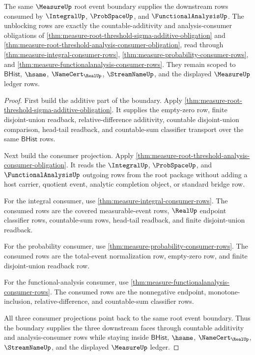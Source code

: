\begin{theorem}
\label{thm:measure-root-event-boundary-unblock}
The same $\MeasureUp$ root event boundary supplies the downstream rows
consumed by $\IntegralUp$, $\ProbSpaceUp$, and $\FunctionalAnalysisUp$. The
unblocking rows are exactly the countable-additivity and analysis-consumer
obligations of
\autoref{thm:measure-root-threshold-sigma-additive-obligation} and
\autoref{thm:measure-root-threshold-analysis-consumer-obligation}, read
through \autoref{thm:measure-integral-consumer-rows},
\autoref{thm:measure-probability-consumer-rows}, and
\autoref{thm:measure-functionalanalysis-consumer-rows}. They remain scoped to
$\mathsf{BHist}$, $\hsame$, $\NameCert_{\RealUp}$, $\StreamNameUp$, and the
displayed $\MeasureUp$ ledger rows.
\end{theorem}
\begin{proof}
First build the additive part of the boundary. Apply
\autoref{thm:measure-root-threshold-sigma-additive-obligation}. It supplies
the empty-zero row, finite disjoint-union readback, relative-difference
additivity, countable disjoint-union comparison, head-tail readback, and
countable-sum classifier transport over the same $\mathsf{BHist}$ rows.

Next build the consumer projection. Apply
\autoref{thm:measure-root-threshold-analysis-consumer-obligation}. It reads
the $\IntegralUp$, $\ProbSpaceUp$, and $\FunctionalAnalysisUp$ outgoing rows
from the root package without adding a host carrier, quotient event, analytic
completion object, or standard bridge row.

For the integral consumer, use
\autoref{thm:measure-integral-consumer-rows}. The consumed rows are the
covered measurable-event rows, $\RealUp$ endpoint classifier rows,
countable-sum rows, head-tail readback, and finite disjoint-union readback.

For the probability consumer, use
\autoref{thm:measure-probability-consumer-rows}. The consumed rows are the
total-event normalization row, empty-zero row, and finite disjoint-union
readback row.

For the functional-analysis consumer, use
\autoref{thm:measure-functionalanalysis-consumer-rows}. The consumed rows
are the nonnegative endpoint, monotone-inclusion, relative-difference, and
countable-sum classifier rows.

All three consumer projections point back to the same root event boundary.
Thus the boundary supplies the three downstream faces through countable
additivity and analysis-consumer rows while staying inside
$\mathsf{BHist}$, $\hsame$, $\NameCert_{\RealUp}$, $\StreamNameUp$, and the
displayed $\MeasureUp$ ledger.
\end{proof}
